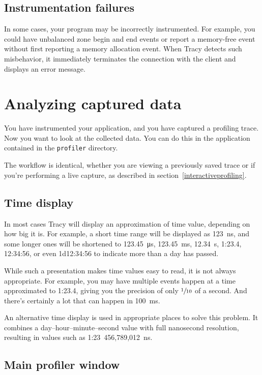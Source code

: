 \documentclass[hidelinks,titlepage,a4paper]{article}
\begin{document}
\subsection{Instrumentation failures}
\label{instrumentationfailures}

In some cases, your program may be incorrectly instrumented. For example, you could have unbalanced zone begin and end events or report a memory-free event without first reporting a memory allocation event. When Tracy detects such misbehavior, it immediately terminates the connection with the client and displays an error message.

\section{Analyzing captured data}
\label{analyzingdata}

You have instrumented your application, and you have captured a profiling trace. Now you want to look at the collected data. You can do this in the application contained in the \texttt{profiler} directory.

The workflow is identical, whether you are viewing a previously saved trace or if you're performing a live capture, as described in section~\ref{interactiveprofiling}.

\subsection{Time display}

In most cases Tracy will display an approximation of time value, depending on how big it is. For example, a short time range will be displayed as 123~\si{\nano\second}, and some longer ones will be shortened to 123.45~\si{\micro\second}, 123.45~\si{\milli\second}, 12.34~\si{\second}, 1:23.4, 12:34:56, or even 1d12:34:56 to indicate more than a day has passed.

While such a presentation makes time values easy to read, it is not always appropriate. For example, you may have multiple events happen at a time approximated to 1:23.4, giving you the precision of only $\sfrac{1}{10}$ of a second. And there's certainly a lot that can happen in 100~\si{\milli\second}.

An alternative time display is used in appropriate places to solve this problem. It combines a day--hour--minute--second value with full nanosecond resolution, resulting in values such as 1:23~456,789,012~\si{\nano\second}.

\subsection{Main profiler window}
\end{document}
